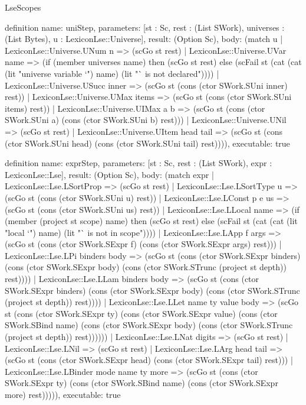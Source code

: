 \begin{lexlean}{LseScopes}
\begin{semanticmodule}
definition{
  name: uniStep,
  parameters: [st : Sc, rest : (List SWork), universes : (List Bytes), u : LexiconLse::Universe],
  result: (Option Sc),
  body: (match u
    | LexiconLse::Universe.UNum n => (scGo st rest)
    | LexiconLse::Universe.UVar name => (if (member universes name) then (scGo st rest) else (scFail st (cat (cat (lit "universe variable `") name) (lit "` is not declared"))))
    | LexiconLse::Universe.USucc inner => (scGo st (cons (ctor SWork.SUni inner) rest))
    | LexiconLse::Universe.UMax items => (scGo st (cons (ctor SWork.SUni items) rest))
    | LexiconLse::Universe.UIMax a b => (scGo st (cons (ctor SWork.SUni a) (cons (ctor SWork.SUni b) rest)))
    | LexiconLse::Universe.UNil => (scGo st rest)
    | LexiconLse::Universe.UItem head tail => (scGo st (cons (ctor SWork.SUni head) (cons (ctor SWork.SUni tail) rest)))),
  executable: true
}

definition{
  name: exprStep,
  parameters: [st : Sc, rest : (List SWork), expr : LexiconLse::Lse],
  result: (Option Sc),
  body: (match expr
    | LexiconLse::Lse.LSortProp => (scGo st rest)
    | LexiconLse::Lse.LSortType u => (scGo st (cons (ctor SWork.SUni u) rest))
    | LexiconLse::Lse.LConst p e us => (scGo st (cons (ctor SWork.SUni us) rest))
    | LexiconLse::Lse.LLocal name => (if (member (project st scope) name) then (scGo st rest) else (scFail st (cat (cat (lit "local `") name) (lit "` is not in scope"))))
    | LexiconLse::Lse.LApp f args => (scGo st (cons (ctor SWork.SExpr f) (cons (ctor SWork.SExpr args) rest)))
    | LexiconLse::Lse.LPi binders body => (scGo st (cons (ctor SWork.SExpr binders) (cons (ctor SWork.SExpr body) (cons (ctor SWork.STrunc (project st depth)) rest))))
    | LexiconLse::Lse.LLam binders body => (scGo st (cons (ctor SWork.SExpr binders) (cons (ctor SWork.SExpr body) (cons (ctor SWork.STrunc (project st depth)) rest))))
    | LexiconLse::Lse.LLet name ty value body => (scGo st (cons (ctor SWork.SExpr ty) (cons (ctor SWork.SExpr value) (cons (ctor SWork.SBind name) (cons (ctor SWork.SExpr body) (cons (ctor SWork.STrunc (project st depth)) rest))))))
    | LexiconLse::Lse.LNat digits => (scGo st rest)
    | LexiconLse::Lse.LNil => (scGo st rest)
    | LexiconLse::Lse.LArg head tail => (scGo st (cons (ctor SWork.SExpr head) (cons (ctor SWork.SExpr tail) rest)))
    | LexiconLse::Lse.LBinder mode name ty more => (scGo st (cons (ctor SWork.SExpr ty) (cons (ctor SWork.SBind name) (cons (ctor SWork.SExpr more) rest))))),
  executable: true
}


\end{semanticmodule}
\end{lexlean}

